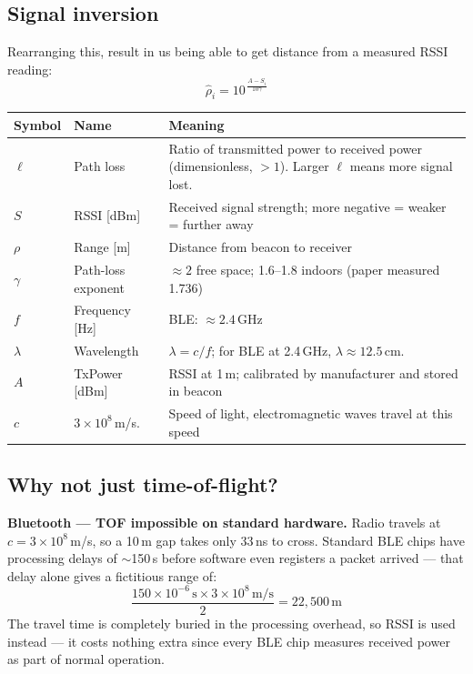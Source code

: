 \documentclass[12pt, a4paper]{article}
\begin{document}
\subsection*{Signal inversion}
Rearranging this, result in us being able to get distance from a measured RSSI reading:
\[
  \hat{\rho}_i = 10^{\,\frac{A - S_i}{10\gamma}}
\]

\begin{center}
\renewcommand{\arraystretch}{1.4}
\begin{tabular}{p{1.3cm} p{3.2cm} p{7.5cm}}
  \toprule
  \textbf{Symbol} & \textbf{Name} & \textbf{Meaning} \\
  \midrule
  $\ell$ & Path loss & Ratio of transmitted power to received power
    (dimensionless, $> 1$).  Larger $\ell$ means more signal lost. \\
  $S$       & RSSI [dBm]         & Received signal strength; more negative = weaker = further away \\
  $\rho$    & Range [m]          & Distance from beacon to receiver \\
  $\gamma$  & Path-loss exponent & $\approx 2$ free space; 1.6--1.8 indoors (paper measured 1.736) \\
  $f$       & Frequency [Hz]     & BLE: $\approx 2.4$\,GHz \\
  $\lambda$ & Wavelength & $\lambda = c/f$; for BLE at 2.4\,GHz,
    $\lambda \approx 12.5$\,cm. \\
  $A$       & TxPower [dBm]      & RSSI at 1\,m; calibrated by manufacturer and stored in beacon \\
  $c$       & $3\times10^8$\,m/s. & Speed of light, electromagnetic waves travel at this speed \\
  \bottomrule
\end{tabular}
\end{center}
\subsection*{Why not just time-of-flight?}

\begin{notebox}
  \textbf{Bluetooth --- TOF impossible on standard hardware.}
  Radio travels at $c = 3\times10^8$\,m/s, so a 10\,m gap takes only
  33\,ns to cross. Standard BLE chips have processing delays of
  $\sim$150\,\textmu s before software even registers a packet arrived
  --- that delay alone gives a fictitious range of:
  \[
    \frac{150\times10^{-6}\,\text{s} \times 3\times10^8\,\text{m/s}}{2}
    = 22{,}500\,\text{m}
  \]
  The travel time is completely buried in the processing overhead, so
  RSSI is used instead --- it costs nothing extra since every BLE chip
  measures received power as part of normal operation.
\end{notebox}
\end{document}
